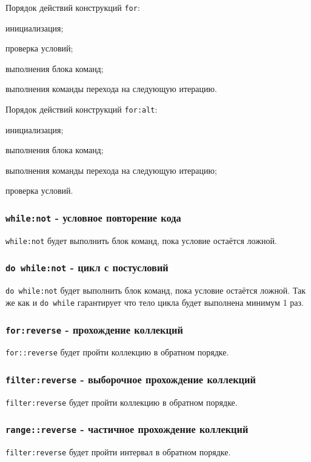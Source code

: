 Порядок действий конструкций \lstinline|for|:
\begin{icEnum}
	\item инициализация;
	\item проверка условий;
	\item выполнения блока команд;
	\item выполнения команды перехода на следующую итерацию.
\end{icEnum}

Порядок действий конструкций \lstinline|for:alt|:
\begin{icEnum}
	\item инициализация;
	\item выполнения блока команд;
	\item выполнения команды перехода на следующую итерацию;
	\item проверка условий.
\end{icEnum}

\subsubsection{\lstinline|while:not| - условное повторение кода}

\lstinline|while:not| будет выполнить блок команд, пока условие остаётся ложной.

\subsubsection{\lstinline|do while:not| - цикл с постусловий}

\lstinline|do while:not| будет выполнить блок команд, пока условие остаётся ложной. Так же как и \lstinline|do while| гарантирует что тело цикла будет выполнена минимум 1 раз.

\subsubsection{\lstinline|for:reverse| - прохождение коллекций}

\lstinline|for::reverse| будет пройти коллекцию в обратном порядке.

\subsubsection{\lstinline|filter:reverse| - выборочное прохождение коллекций}

\lstinline|filter:reverse| будет пройти коллекцию в обратном порядке.

\subsubsection{\lstinline|range::reverse| - частичное прохождение коллекций}

\lstinline|filter:reverse| будет пройти интервал в обратном порядке.

